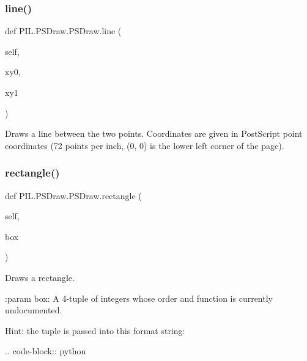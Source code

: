 \subsubsection{\texorpdfstring{line()}{line()}}
{\footnotesize\ttfamily def P\+I\+L.\+P\+S\+Draw.\+P\+S\+Draw.\+line (\begin{DoxyParamCaption}\item[{}]{self,  }\item[{}]{xy0,  }\item[{}]{xy1 }\end{DoxyParamCaption})}

\begin{DoxyVerb}Draws a line between the two points. Coordinates are given in
PostScript point coordinates (72 points per inch, (0, 0) is the lower
left corner of the page).
\end{DoxyVerb}
 \mbox{\label{classPIL_1_1PSDraw_1_1PSDraw_a88beeda25cfc8bdd1c05f5f792319cb7}} 
\subsubsection{\texorpdfstring{rectangle()}{rectangle()}}
{\footnotesize\ttfamily def P\+I\+L.\+P\+S\+Draw.\+P\+S\+Draw.\+rectangle (\begin{DoxyParamCaption}\item[{}]{self,  }\item[{}]{box }\end{DoxyParamCaption})}

\begin{DoxyVerb}Draws a rectangle.

:param box: A 4-tuple of integers whose order and function is currently
    undocumented.

    Hint: the tuple is passed into this format string:

    .. code-block:: python

\end{DoxyVerb}
 \mbox{\label{classPIL_1_1PSDraw_1_1PSDraw_a1d1b82fdfb2a77570cfc6db45922afeb}} 
